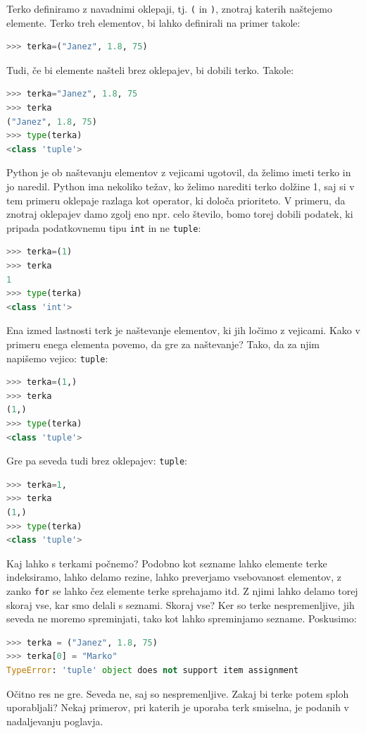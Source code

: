 Terko definiramo z navadnimi oklepaji, tj. \texttt{(} in \texttt{)}, znotraj katerih naštejemo elemente. Terko treh elementov, bi lahko definirali na primer takole:
\begin{lstlisting}[language=Python]
>>> terka=("Janez", 1.8, 75)
\end{lstlisting}
Tudi, če bi elemente našteli brez oklepajev, bi dobili terko. Takole:
\begin{lstlisting}[language=Python]
>>> terka="Janez", 1.8, 75
>>> terka
("Janez", 1.8, 75)
>>> type(terka)
<class 'tuple'>
\end{lstlisting}
Python je ob naštevanju elementov z vejicami ugotovil, da želimo imeti terko in jo naredil. Python ima nekoliko težav, ko želimo narediti terko dolžine 1, saj si v tem primeru oklepaje razlaga kot operator, ki določa prioriteto. V primeru, da znotraj oklepajev damo zgolj eno npr. celo število, bomo torej dobili podatek, ki pripada podatkovnemu tipu \texttt{int} in ne \texttt{tuple}:
\begin{lstlisting}[language=Python]
>>> terka=(1)
>>> terka
1
>>> type(terka)
<class 'int'>
\end{lstlisting}
Ena izmed lastnosti terk je naštevanje elementov, ki jih ločimo z vejicami. Kako v primeru enega elementa povemo, da gre za naštevanje? Tako, da za njim napišemo vejico:
\texttt{tuple}:
\begin{lstlisting}[language=Python]
>>> terka=(1,)
>>> terka
(1,)
>>> type(terka)
<class 'tuple'>
\end{lstlisting}
Gre pa seveda tudi brez oklepajev:
\texttt{tuple}:
\begin{lstlisting}[language=Python]
>>> terka=1,
>>> terka
(1,)
>>> type(terka)
<class 'tuple'>
\end{lstlisting}

Kaj lahko s terkami počnemo? Podobno kot sezname lahko elemente terke indeksiramo, lahko delamo rezine, lahko preverjamo vsebovanost elementov, z zanko \texttt{for} se lahko čez elemente terke sprehajamo itd. Z njimi lahko delamo torej skoraj vse, kar smo delali s seznami. Skoraj vse? Ker so terke nespremenljive, jih seveda ne moremo spreminjati, tako kot lahko spreminjamo sezname. Poskusimo:
\begin{lstlisting}[language=Python]
>>> terka = ("Janez", 1.8, 75)
>>> terka[0] = "Marko"
TypeError: 'tuple' object does not support item assignment
\end{lstlisting}
Očitno res ne gre. Seveda ne, saj so nespremenljive. Zakaj bi terke potem sploh uporabljali? Nekaj primerov, pri katerih je uporaba terk smiselna, je podanih v nadaljevanju poglavja.

